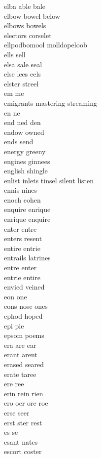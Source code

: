 elba able bale\\
elbow bowel below\\
elbows bowels\\
electors corselet\\
ellpodbomool molldopeloob\\
ells sell\\
elsa sale seal\\
else lees eels\\
elster streel\\
em me\\
emigrants mastering streaming\\
en ne\\
end ned den\\
endow owned\\
ends send\\
energy greeny\\
engines ginnees\\
english shingle\\
enlist inlets tinsel silent listen\\
ennis nines\\
enoch cohen\\
enquire enrique\\
enrique enquire\\
enter entre\\
enters resent\\
entire entrie\\
entrails latrines\\
entre enter\\
entrie entire\\
envied veined\\
eon one\\
eons nose ones\\
ephod hoped\\
epi pie\\
epsom poems\\
era are ear\\
erant arent\\
erased seared\\
erate taree\\
ere ree\\
erin rein rien\\
ero oer ore roe\\
erse seer\\
erst ster rest\\
es se\\
esant nates\\
escort coster\\
